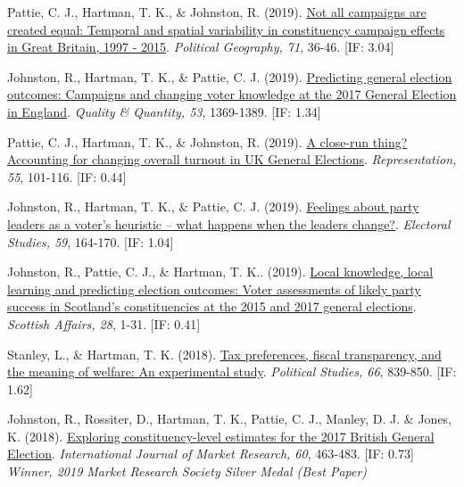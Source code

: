 \documentclass[12pt]{article}
\begin{document}
\begin{bibenum}
	\item Pattie, C. J., {Hartman, T. K.}, \& Johnston, R. (2019). 
	    \href{https://10.1016/j.polgeo.2019.02.010}
		{Not all campaigns are created equal: Temporal and spatial variability 
		in constituency campaign effects in Great Britain, 1997 - 2015}. 
	 	\emph{Political Geography, 71}, 36-46. [IF: 3.04]
	 	    
	\item Johnston, R., {Hartman, T. K.}, \& Pattie, C. J. (2019). 
		\href{https://10.1007/s11135-018-0819-1}
		{Predicting general election outcomes: Campaigns and changing voter 
		knowledge at the 2017 General Election in England}.
		\emph{Quality \& Quantity, 53}, 1369-1389. [IF: 1.34]
	 	    
    \item Pattie, C. J., {Hartman, T. K.}, \& Johnston, R. (2019).
    	\href{https://10.1080/00344893.2018.1555676}
    	{A close-run thing? Accounting for changing overall turnout in UK General Elections}.
    	\emph{Representation, 55}, 101-116. [IF: 0.44]

    \item Johnston, R., {Hartman, T. K.}, \& Pattie, C. J. (2019). 
    		\href{https://10.1016/j.electstud.2018.12.005}
    		{Feelings about party leaders as a voter's heuristic -- 
    		what happens when the leaders change?}.
        \emph{Electoral Studies, 59}, 164-170. [IF: 1.04]
          
	\item Johnston, R., Pattie, C. J., \& {Hartman, T. K.}. (2019). 
		\href{https://10.3366/scot.2019.0263}
		{Local knowledge, local learning and predicting election outcomes: 
		Voter assessments of likely party success in Scotland's constituencies 
		at the 2015 and 2017 general elections}.
		\emph{Scottish Affairs, 28}, 1-31. [IF: 0.41]
		
	\item Stanley, L., \& {Hartman, T. K.} (2018).
          \href{https://10.1177/0032321717731661}
          {Tax preferences, fiscal transparency, and the meaning of welfare: 
          An experimental study}. 
          \emph{Political Studies, 66}, 839-850. [IF: 1.62]
          
	\item Johnston, R., Rossiter, D., {Hartman, T. K.}, Pattie, C. J., 
		   Manley, D. J. \&  Jones, K. (2018). 
		  \href{https://10.1177/1470785318778247}
		  {Exploring constituency-level estimates for the 2017 British General Election}.
		  \emph{International Journal of Market Research, 60}, 463-483. [IF: 0.73]\\
		  \textit{Winner, 2019 Market Research Society Silver Medal (Best Paper)}


\end{bibenum}
\end{document}

